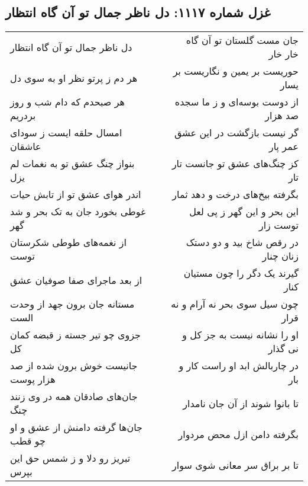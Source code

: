 \begin{center}
\section*{غزل شماره ۱۱۱۷: دل ناظر جمال تو آن گاه انتظار}
\label{sec:1117}
\begin{longtable}{l p{0.5cm} r}
دل ناظر جمال تو آن گاه انتظار
&&
جان مست گلستان تو آن گاه خار خار
\\
هر دم ز پرتو نظر او به سوی دل
&&
حوریست بر یمین و نگاریست بر یسار
\\
هر صبحدم که دام شب و روز بردریم
&&
از دوست بوسه‌ای و ز ما سجده صد هزار
\\
امسال حلقه ایست ز سودای عاشقان
&&
گر نیست بازگشت در این عشق عمر پار
\\
بنواز چنگ عشق تو به نغمات لم یزل
&&
کز چنگ‌های عشق تو جانست تار تار
\\
اندر هوای عشق تو از تابش حیات
&&
بگرفته بیخ‌های درخت و دهد ثمار
\\
غوطی بخورد جان به تک بحر و شد گهر
&&
این بحر و این گهر ز پی لعل توست زار
\\
از نغمه‌های طوطی شکرستان توست
&&
در رقص شاخ بید و دو دستک زنان چنار
\\
از بعد ماجرای صفا صوفیان عشق
&&
گیرند یک دگر را چون مستیان کنار
\\
مستانه جان برون جهد از وحدت الست
&&
چون سیل سوی بحر نه آرام و نه قرار
\\
جزوی چو تیر جسته ز قبضه کمان کل
&&
او را نشانه نیست به جز کل و نی گذار
\\
جانیست خوش برون شده از صد هزار پوست
&&
در چاربالش ابد او راست کار و بار
\\
جان‌های صادقان همه در وی زنند چنگ
&&
تا بانوا شوند از آن جان نامدار
\\
جان‌ها گرفته دامنش از عشق و او چو قطب
&&
بگرفته دامن ازل محض مردوار
\\
تبریز رو دلا و ز شمس حق این بپرس
&&
تا بر براق سر معانی شوی سوار
\\
\end{longtable}
\end{center}
